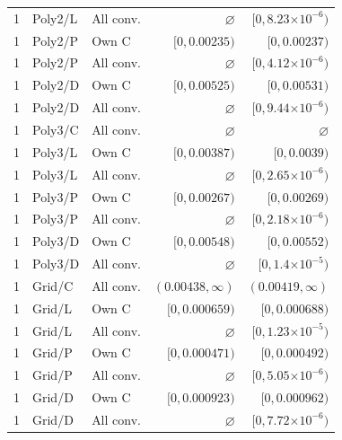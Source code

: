 \begin{longtable}{lllrr}
1 & Poly2/L & All conv. & $\varnothing$ & $[0, 8.23\mathord{\times}10^{-6})$ \\
1 & Poly2/P & Own C & $[0, 0.00235)$ & $[0, 0.00237)$ \\
1 & Poly2/P & All conv. & $\varnothing$ & $[0, 4.12\mathord{\times}10^{-6})$ \\
1 & Poly2/D & Own C & $[0, 0.00525)$ & $[0, 0.00531)$ \\
1 & Poly2/D & All conv. & $\varnothing$ & $[0, 9.44\mathord{\times}10^{-6})$ \\
1 & Poly3/C & All conv. & $\varnothing$ & $\varnothing$ \\
1 & Poly3/L & Own C & $[0, 0.00387)$ & $[0, 0.0039)$ \\
1 & Poly3/L & All conv. & $\varnothing$ & $[0, 2.65\mathord{\times}10^{-6})$ \\
1 & Poly3/P & Own C & $[0, 0.00267)$ & $[0, 0.00269)$ \\
1 & Poly3/P & All conv. & $\varnothing$ & $[0, 2.18\mathord{\times}10^{-6})$ \\
1 & Poly3/D & Own C & $[0, 0.00548)$ & $[0, 0.00552)$ \\
1 & Poly3/D & All conv. & $\varnothing$ & $[0, 1.4\mathord{\times}10^{-5})$ \\
1 & Grid/C & All conv. & $(0.00438, \infty)$ & $(0.00419, \infty)$ \\
1 & Grid/L & Own C & $[0, 0.000659)$ & $[0, 0.000688)$ \\
1 & Grid/L & All conv. & $\varnothing$ & $[0, 1.23\mathord{\times}10^{-5})$ \\
1 & Grid/P & Own C & $[0, 0.000471)$ & $[0, 0.000492)$ \\
1 & Grid/P & All conv. & $\varnothing$ & $[0, 5.05\mathord{\times}10^{-6})$ \\
1 & Grid/D & Own C & $[0, 0.000923)$ & $[0, 0.000962)$ \\
1 & Grid/D & All conv. & $\varnothing$ & $[0, 7.72\mathord{\times}10^{-6})$ \\
\end{longtable}
\endgroup


